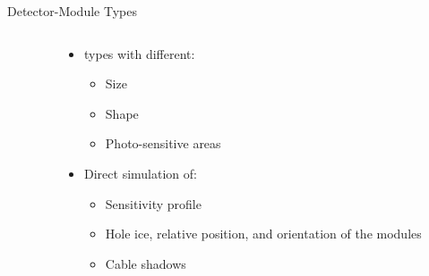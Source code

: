 
\begin{frame}[fragile]{Detector-Module Types}

  \begin{columns}
    \begin{column}{0.7\textwidth}
      \begin{overlayarea}{\textwidth}{\textheight}
        \vspace*{2cm}
      \end{overlayarea}
    \end{column}
    \begin{column}{0.3\textwidth}
      \begin{itemize}
        \item {} types with different:
        \begin{itemize}
          \item Size
          \item Shape
          \item Photo-sensitive areas
        \end{itemize}
        \item Direct simulation of:
        \begin{itemize}
          \item Sensitivity profile
          \item Hole ice, relative position, and orientation of the modules
          \item Cable shadows
        \end{itemize}
      \end{itemize}

      \vspace{2cm}

    \end{column}
  \end{columns}

\end{frame}